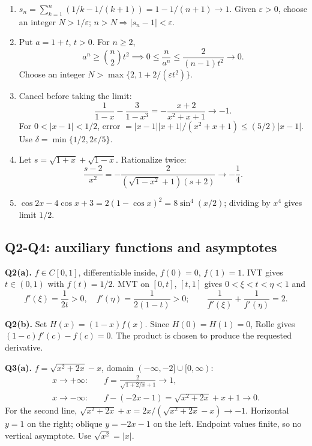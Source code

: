 \documentclass[11pt,letterpaper]{article}
\begin{document}
\begin{enumerate}
\def\labelenumi{(\alph{enumi})}
\item
  \(s_n=\sum_{k=1}^n(1/k-1/(k+1))=1-1/(n+1)\to1\). Given
  \(\varepsilon>0\), choose an integer \(N>1/\varepsilon\);
  \(n>N\Rightarrow|s_n-1|<\varepsilon\).
\item
  Put \(a=1+t\), \(t>0\). For \(n\ge2\), \[
  a^n\ge\binom n2t^2\implies0\le\frac n{a^n}\le\frac2{(n-1)t^2}\to0.
  \] Choose an integer \(N>\max\{2,1+2/(\varepsilon t^2)\}\).
\item
  Cancel before taking the limit: \[
  \frac1{1-x}-\frac3{1-x^3}=-\frac{x+2}{x^2+x+1}\to-1.
  \] For \(0<|x-1|<1/2\), error \(=|x-1||x+1|/(x^2+x+1)\le(5/2)|x-1|\).
  Use \(\delta=\min\{1/2,2\varepsilon/5\}\).
\item
  Let \(s=\sqrt{1+x}+\sqrt{1-x}\). Rationalize twice: \[
  \frac{s-2}{x^2}=-\frac2{(\sqrt{1-x^2}+1)(s+2)}\to-\frac14.
  \]
\item
  \(\cos2x-4\cos x+3=2(1-\cos x)^2=8\sin^4(x/2)\); dividing by \(x^4\)
  gives limit \(1/2\).
\end{enumerate}

\subsection{Q2-Q4: auxiliary functions and
asymptotes}\label{q2-q4-auxiliary-functions-and-asymptotes}

\textbf{Q2(a).} \(f\in C[0,1]\), differentiable inside, \(f(0)=0\),
\(f(1)=1\). IVT gives \(t\in(0,1)\) with \(f(t)=1/2\). MVT on \([0,t]\),
\([t,1]\) gives \(0<\xi<t<\eta<1\) and \[
f'(\xi)=\frac1{2t}>0,\quad f'(\eta)=\frac1{2(1-t)}>0;\qquad
\frac1{f'(\xi)}+\frac1{f'(\eta)}=2.
\]

\textbf{Q2(b).} Set \(H(x)=(1-x)f(x)\). Since \(H(0)=H(1)=0\), Rolle
gives \((1-c)f'(c)-f(c)=0\). The product is chosen to produce the
requested derivative.

\textbf{Q3(a).} \(f=\sqrt{x^2+2x}-x\), domain
\((-\infty,-2]\cup[0,\infty)\): \[
\begin{aligned}
x\to+\infty:&\quad f=\frac2{\sqrt{1+2/x}+1}\to1,\\
x\to-\infty:&\quad f-(-2x-1)=\sqrt{x^2+2x}+x+1\to0.
\end{aligned}
\] For the second line, \(\sqrt{x^2+2x}+x=2x/(\sqrt{x^2+2x}-x)\to-1\).
Horizontal \(y=1\) on the right; oblique \(y=-2x-1\) on the left.
Endpoint values finite, so no vertical asymptote. Use
\(\sqrt{x^2}=|x|\).
\end{document}
